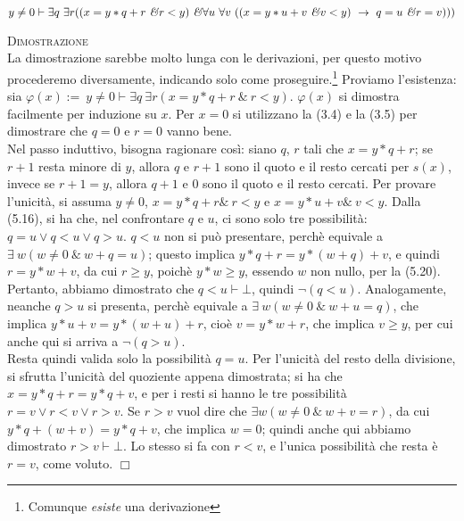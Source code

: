\begin{prop}
{\tiny{$$y\neq 0\vdash \exists q\ \exists r((x=y*q+r\ \mbox{\emph{\&}} r<y)\ \mbox{\emph{\&}} \forall u\ \forall v\ ((x=y*u+v\ \mbox{\emph{\&}} v<y)\ \to\ q=u\ \mbox{\emph{\&}} r=v)))$$}}
\end{prop}
\vspace{.5cm}
\textsc{Dimostrazione}
\\La dimostrazione sarebbe molto lunga con le derivazioni, per questo motivo procederemo diversamente, indicando solo come proseguire.\footnote{Comunque \textsl{esiste} una derivazione}\newline
Proviamo l'esistenza: sia $\varphi(x):=\ y\neq 0\vdash \exists q\ \exists r(x=y*q+r\ \mbox{\&}\ r<y)$. $\varphi(x)$ si dimostra facilmente per induzione su $x$. Per $x=0$ si utilizzano la (3.4) e la (3.5) per dimostrare che $q=0$ e $r=0$ vanno bene.\\ Nel passo induttivo, bisogna ragionare cos\`i: siano $q$, $r$ tali che $x=y*q+r$; se $r+1$ resta minore di $y$, allora $q$ e $r+1$ sono il quoto e il resto cercati per $s(x)$, invece se $r+1=y$, allora $q+1$ e $0$ sono il quoto e il resto cercati.\newline
Per provare l'unicit\`a, si assuma $y\neq 0$, $x=y*q+r \mbox{\&}\ r<y$ e $x=y*u+v\mbox{\&}\ v<y$. Dalla (5.16), si ha che, nel confrontare $q$ e $u$, ci sono solo tre possibilit\`a: $q=u\vee q<u\vee q>u$.  $q<u$ non si pu\`o presentare, perch\`e equivale a $\exists\ w(w\neq 0\ \mbox{\&}\ w+q=u)$; questo implica $y*q+r= y*(w+q)+v$, e quindi $r=y*w+v$, da cui $r\geq y$, poich\`e $y*w\geq y$, essendo $w$ non nullo, per la (5.20). \\Pertanto, abbiamo dimostrato che $q<u \vdash \bot $, quindi $\neg (q<u)$. Analogamente, neanche $q>u$ si presenta, perch\`e equivale a $\exists\ w(w\neq 0\ \mbox{\&}\ w+u=q)$, che implica $y*u+v= y*(w+u)+r$, cio\`e $v=y*w+r$, che implica $v\geq y$, per cui anche qui si arriva a $\neg (q>u)$. \\Resta quindi valida solo la possibilit\`a $q=u$. Per l'unicit\`a del resto della divisione, si sfrutta l'unicit\`a del quoziente appena dimostrata; si ha che $x=y*q+r=y*q+v$, e per i resti si hanno le tre possibilit\`a $r=v\vee r<v\vee r>v$. Se $r>v$ vuol dire che $\exists w(w\neq 0\ \mbox{\&}\ w+v=r)$, da cui $y*q+(w+v)=y*q+v$, che implica $w=0$; quindi anche qui abbiamo dimostrato $r>v \vdash \bot$. Lo stesso si fa con $r<v$, e l'unica possibilit\`a che resta \`e $r=v$, come voluto.
 $\Box$\\


